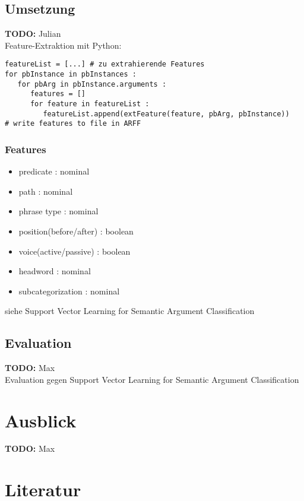 \documentclass[runningheads]{llncs}
\begin{document}
\subsection{Umsetzung}
\textbf{TODO:} Julian\\
Feature-Extraktion mit Python:
\begin{lstlisting}[frame=lines]
featureList = [...] # zu extrahierende Features
for pbInstance in pbInstances :
   for pbArg in pbInstance.arguments :
      features = []
      for feature in featureList :
         featureList.append(extFeature(feature, pbArg, pbInstance))
# write features to file in ARFF
\end{lstlisting}

\subsubsection{Features}
\begin{itemize}
\item predicate : nominal
\item path : nominal
\item phrase type : nominal
\item position(before/after) : boolean
\item voice(active/passive) : boolean
\item headword : nominal
\item subcategorization : nominal
\end{itemize}
siehe Support Vector Learning for Semantic Argument Classiﬁcation

\subsection{Evaluation}
\textbf{TODO:} Max\\
Evaluation gegen Support Vector Learning for Semantic Argument Classiﬁcation

\section{Ausblick}
\textbf{TODO:} Max

\section{Literatur}
{}

\end{document}
